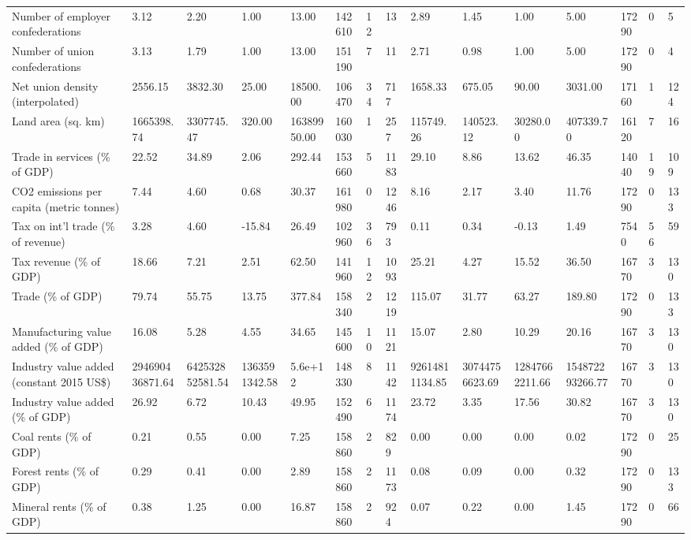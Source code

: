 \begin{longtable}{lllllllllllllll}
\addlinespace
Number of employer confederations & 3.12 & 2.20 & 1.00 & 13.00 & 142610 & 12 & 13 & 2.89 & 1.45 & 1.00 & 5.00 & 17290 & 0 & 5\\
Number of union confederations & 3.13 & 1.79 & 1.00 & 13.00 & 151190 & 7 & 11 & 2.71 & 0.98 & 1.00 & 5.00 & 17290 & 0 & 4\\
Net union density (interpolated) & 2556.15 & 3832.30 & 25.00 & 18500.00 & 106470 & 34 & 717 & 1658.33 & 675.05 & 90.00 & 3031.00 & 17160 & 1 & 124\\
Land area (sq. km) & 1665398.74 & 3307745.47 & 320.00 & 16389950.00 & 160030 & 1 & 257 & 115749.26 & 140523.12 & 30280.00 & 407339.70 & 16120 & 7 & 16\\
Trade in services (\% of GDP) & 22.52 & 34.89 & 2.06 & 292.44 & 153660 & 5 & 1183 & 29.10 & 8.86 & 13.62 & 46.35 & 14040 & 19 & 109\\
\addlinespace
CO2 emissions per capita (metric tonnes) & 7.44 & 4.60 & 0.68 & 30.37 & 161980 & 0 & 1246 & 8.16 & 2.17 & 3.40 & 11.76 & 17290 & 0 & 133\\
Tax on int'l trade (\% of revenue) & 3.28 & 4.60 & -15.84 & 26.49 & 102960 & 36 & 793 & 0.11 & 0.34 & -0.13 & 1.49 & 7540 & 56 & 59\\
Tax revenue (\% of GDP) & 18.66 & 7.21 & 2.51 & 62.50 & 141960 & 12 & 1093 & 25.21 & 4.27 & 15.52 & 36.50 & 16770 & 3 & 130\\
Trade (\% of GDP) & 79.74 & 55.75 & 13.75 & 377.84 & 158340 & 2 & 1219 & 115.07 & 31.77 & 63.27 & 189.80 & 17290 & 0 & 133\\
Manufacturing value added (\% of GDP) & 16.08 & 5.28 & 4.55 & 34.65 & 145600 & 10 & 1121 & 15.07 & 2.80 & 10.29 & 20.16 & 16770 & 3 & 130\\
\addlinespace
Industry value added (constant 2015 US\$) & 294690436871.64 & 642532852581.54 & 1363591342.58 & 5.6e+12 & 148330 & 8 & 1142 & 92614811134.85 & 30744756623.69 & 12847662211.66 & 154872293266.77 & 16770 & 3 & 130\\
Industry value added (\% of GDP) & 26.92 & 6.72 & 10.43 & 49.95 & 152490 & 6 & 1174 & 23.72 & 3.35 & 17.56 & 30.82 & 16770 & 3 & 130\\
Coal rents (\% of GDP) & 0.21 & 0.55 & 0.00 & 7.25 & 158860 & 2 & 829 & 0.00 & 0.00 & 0.00 & 0.02 & 17290 & 0 & 25\\
Forest rents (\% of GDP) & 0.29 & 0.41 & 0.00 & 2.89 & 158860 & 2 & 1173 & 0.08 & 0.09 & 0.00 & 0.32 & 17290 & 0 & 133\\
Mineral rents (\% of GDP) & 0.38 & 1.25 & 0.00 & 16.87 & 158860 & 2 & 924 & 0.07 & 0.22 & 0.00 & 1.45 & 17290 & 0 & 66\\

\end{longtable}
